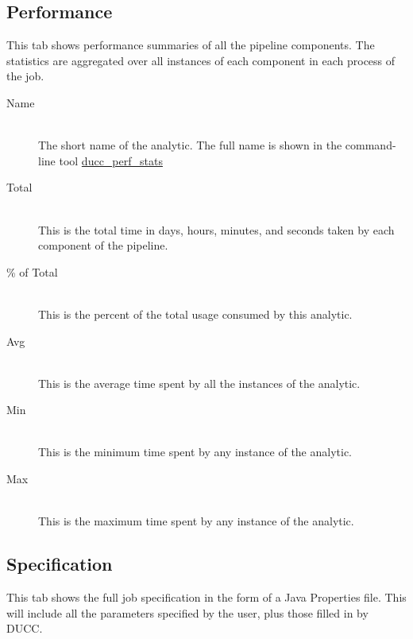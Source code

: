    \subsection{Performance}
   \label{subsec:performance}
   This tab shows performance summaries of all the pipeline components.  The statistics
   are aggregated over all instances of each component in each process of the job.
   
   \begin{description}
     \item[Name]  \hfill \\
       The short name of the analytic.  The full name is shown in the command-line
       tool \hyperref[sec:cli.ducc-perf-stats]{ducc\_perf\_stats}
     \item[Total]  \hfill \\
       This is the total time in days, hours, minutes, and seconds taken by each
       component of the pipeline.
     \item[\% of Total]  \hfill \\
       This is the percent of the total usage consumed by this analytic.
     \item[Avg]  \hfill \\
       This is the average time spent by all the instances of the analytic.
     \item[Min]  \hfill \\
       This is the minimum time spent by any instance of the analytic.
     \item[Max]  \hfill \\
       This is the maximum time spent by any instance of the analytic.
   \end{description}
   
   \subsection{Specification}
   This tab shows the full job specification in the form of a Java Properties
   file.  This will include all the parameters specified by the user, plus those
   filled in by DUCC.
